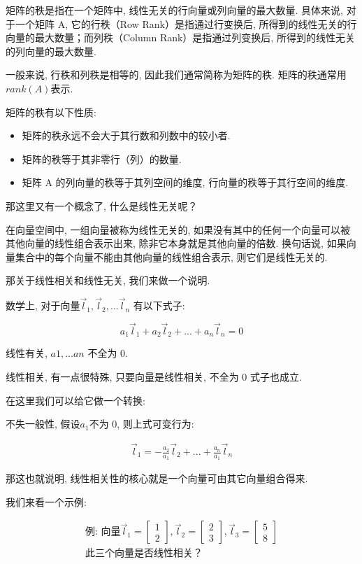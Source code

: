 矩阵的秩是指在一个矩阵中, 线性无关的行向量或列向量的最大数量. 具体来说, 对于一个矩阵 A, 它的行秩（Row Rank）是指通过行变换后, 所得到的线性无关的行向量的最大数量；而列秩（Column Rank）是指通过列变换后, 所得到的线性无关的列向量的最大数量. 

一般来说, 行秩和列秩是相等的, 因此我们通常简称为矩阵的秩. 矩阵的秩通常用$rank(A)$表示. 

矩阵的秩有以下性质: 

\begin{itemize}
  \item 矩阵的秩永远不会大于其行数和列数中的较小者. 
  \item 矩阵的秩等于其非零行（列）的数量. 
  \item 矩阵 A 的列向量的秩等于其列空间的维度, 行向量的秩等于其行空间的维度. 
\end{itemize}

那这里又有一个概念了, 什么是线性无关呢？

在向量空间中, 一组向量被称为线性无关的, 如果没有其中的任何一个向量可以被其他向量的线性组合表示出来, 除非它本身就是其他向量的倍数. 换句话说, 如果向量集合中的每个向量不能由其他向量的线性组合表示, 则它们是线性无关的. 

那关于线性相关和线性无关, 我们来做一个说明. 

数学上, 对于向量\(\vec l_1, \vec l_2, ... \vec l_n\) 有以下式子: 

\[a_1 \vec l_1 + a_2 \vec l_2 + ... + a_n \vec l_n = 0\]

线性有关, \(a1,...an\) 不全为 0.

线性相关, 有一点很特殊, 只要向量是线性相关, 不全为 0 式子也成立. 

在这里我们可以给它做一个转换: 

不失一般性, 假设$a_1$不为 0,  则上式可变行为: 

\begin{align*}
  \vec l_1 = -\frac{a_2}{a_1} \vec l_2 + ... + \frac{a_n}{a_1} \vec l_n
\end{align*}

那这也就说明, 线性相关性的核心就是一个向量可由其它向量组合得来. 

我们来看一个示例: 

\begin{align*}
  \mbox{例: 向量}\vec l_1 = \begin{bmatrix} 1 \\ 2 \end{bmatrix}, \vec l_2 = \begin{bmatrix} 2 \\ 3 \end{bmatrix},\vec l_3 = \begin{bmatrix} 5 \\ 8 \end{bmatrix} \\
  \mbox{此三个向量是否线性相关？}
\end{align*}


